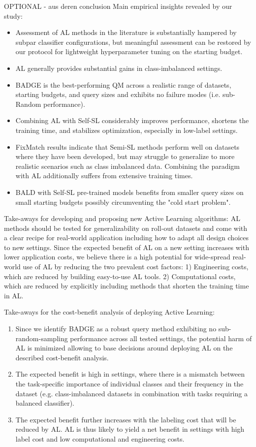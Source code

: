 \documentclass[]{article}
\begin{document}
OPTIONAL - aus deren conclusion
Main empirical insights revealed by our study:
\begin{itemize}
\item Assessment of AL methods in the literature is substantially hampered by subpar classifier configurations, but meaningful assessment can be restored by our protocol for lightweight hyperparameter
tuning on the starting budget.
\item AL generally provides substantial gains in class-imbalanced settings.
\item BADGE is the best-performing QM across a realistic range of datasets, starting budgets, and query
sizes and exhibits no failure modes (i.e. sub-Random performance).
\item Combining AL with Self-SL considerably improves performance, shortens the training time, and
stabilizes optimization, especially in low-label settings.
\item FixMatch results indicate that Semi-SL methods perform well on datasets where they have been
developed, but may struggle to generalize to more realistic scenarios such as class imbalanced data.
Combining the paradigm with AL additionally suffers from extensive training times.
\item BALD with Self-SL pre-trained models benefits from smaller query sizes on small starting budgets
possibly circumventing the "cold start problem".
\end{itemize}

Take-aways for developing and proposing new Active Learning algorithms:
AL methods should be tested for generalizability on roll-out datasets and come with a clear recipe
for real-world application including how to adapt all design choices to new settings. Since the
expected benefit of AL on a new setting increases with lower application costs, we believe there is a
high potential for wide-spread real-world use of AL by reducing the two prevalent cost factors: 1)
Engineering costs, which are reduced by building easy-to-use AL tools. 2) Computational costs,
which are reduced by explicitly including methods that shorten the training time in AL.

Take-aways for the cost-benefit analysis of deploying Active Learning:
\begin{enumerate}
\item Since we identify BADGE as a robust query method exhibiting no sub-random-sampling performance across all tested settings, the potential harm of AL is minimized allowing to base decisions
around deploying AL on the described cost-benefit analysis.
\item The expected benefit is high in settings, where there is a mismatch between the task-specific
importance of individual classes and their frequency in the dataset (e.g. class-imbalanced datasets
in combination with tasks requiring a balanced classifier).
\item The expected benefit further increases with the labeling cost that will be reduced by AL. AL is thus
likely to yield a net benefit in settings with high label cost and low computational and engineering
costs.
\end{enumerate}
\end{document}
